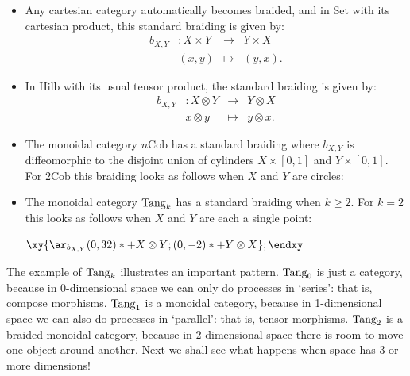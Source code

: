 \documentclass[12pt,twoside,openright]{report}
\newcommand{\Cob}{\mathrm{Cob}}
\newcommand{\Hilb}{\mathrm{Hilb}}
\newcommand{\Set}{\mathrm{Set}}
\newcommand{\Tang}{{\rm Tang}}
\newcommand{\maps}{\colon}
\newcommand{\tensor}{\otimes}
\newcommand{\ucrossc}{
  \begin{scope}[left color=gray, right color=white]
    \shadedraw (.5,0) -- (-1.5,2.5) -- (-.5,2.5) -- (1.5,0)
       .. controls (1.4,-.25) and (.6,-.25) .. (.5,0);
    \shadedraw (-.5,0) -- (1.5,2.5) -- (.5,2.5) -- (-1.5,0)
       .. controls (-1.4,-.25) and (-.6,-.25) .. (-.5,0);
    \shadedraw (-1,2.5) ellipse (.5 and .2);
    \shadedraw (1,2.5) ellipse (.5 and .2);
  \end{scope}
  \draw[dashed] (-1.5,2.5) -- (.5,0);
  \draw[dashed] (-.5,2.5) -- (1.5,0);
  \draw[dashed](1.5,0) arc (0:180:.5 and 0.2);
  \draw[dashed](-.5,0) arc (0:180:.5 and 0.2);
}
\begin{document}
\begin{itemize}
\item Any cartesian category automatically becomes braided, and in $\Set$ with its cartesian product, this standard braiding is given by:
\[
\begin{array}{rccl}
        b_{X,Y} & \maps X\times Y& \to& Y\times X \\
                    & (x,y) &\mapsto & (y,x) .
\end{array}
\]
\item In $\Hilb$ with its usual tensor product, the standard braiding is given by:
\[
\begin{array}{rccl}
        b_{X,Y} & \maps X\tensor Y& \to& Y\tensor X \\
                    & x \tensor y &\mapsto & y \tensor x .
\end{array}
\]
\item The monoidal category $n\Cob$ has a standard braiding where
$b_{X,Y}$ is diffeomorphic to the disjoint union of cylinders $X
\times [0,1]$ and $Y \times [0,1]$.  For $2\Cob$ this braiding looks as follows when $X$ and $Y$ are circles:
\begin{center}
\end{center}

\item The monoidal category $\Tang_k$ has a standard braiding when $k \ge 2$.  For $k = 2$ this looks as follows when $X$ and 
$Y$ are each a single point:
\begin{center}
\epsfysize=1.2in
\qquad
$
 \xy
 {\ar_{b_{X,Y}} (0,32)*+{X \tensor Y}; (0,-2)*+{Y \tensor X}};
 \endxy
$
\end{center}
\end{itemize}

The example of $\Tang_k$ illustrates an important pattern.  $\Tang_0$ is just a category, because in 0-dimensional space we can only do processes in `series': that is, compose morphisms.  $\Tang_1$ is a monoidal category, because in 1-dimensional space we can also do processes in `parallel': that is, tensor morphisms.  $\Tang_2$ is a braided monoidal category, because in 2-dimensional space there is room to move one object around another.  Next we shall see what happens when space has 3 or more dimensions!
\end{document}
